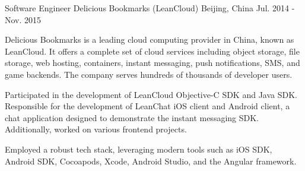 \begin{cventries}
\cventry
{Software Engineer} %
{Delicious Bookmarks (LeanCloud)} %
{Beijing, China} %
{Jul. 2014 - Nov. 2015} %
{
  \begin{cvitems} %
    \item {Delicious Bookmarks is a leading cloud computing provider in China, known as LeanCloud. It offers a complete set of cloud services including object storage, file storage, web hosting, containers, instant messaging, push notifications, SMS, and game backends. The company serves hundreds of thousands of developer users.}
    \item {Participated in the development of LeanCloud Objective-C SDK and Java SDK. Responsible for the development of LeanChat iOS client and Android client, a chat application designed to demonstrate the instant messaging SDK. Additionally, worked on various frontend projects.}
    \item {Employed a robust tech stack, leveraging modern tools such as iOS SDK, Android SDK, Cocoapods, Xcode, Android Studio, and the Angular framework.}
  \end{cvitems}
}


\end{cventries}
